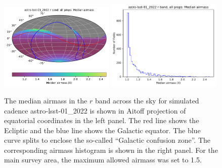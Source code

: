 \documentclass[DM,lsstdraft,authoryear,toc]{lsstdoc}
\begin{document}
\begin{figure}[ht]
\centering
\includegraphics[width=0.49\textwidth]{figures/astro-lsst-01_2022_Median_airmass_r_band_all_props_OPSI_SkyMap}
\includegraphics[width=0.49\textwidth]{figures/astro-lsst-01_2022_Median_airmass_r_band_all_props_OPSI_Histogram}
\caption{The median airmass in the $r$ band across the sky for simulated cadence
astro-lsst-01\_2022 is shown in Aitoff projection of equatorial coordinates
in the left panel. The red line shows the Ecliptic and the blue line shows the Galactic
equator. The blue curve splits to enclose the so-called ``Galactic confusion zone''. The corresponding
airmass histogram is shown in the right panel. For the main survey area, the maximum
allowed airmass was set to 1.5. }
\label{fig:baseline_airmass}
\end{figure}
\end{document}
